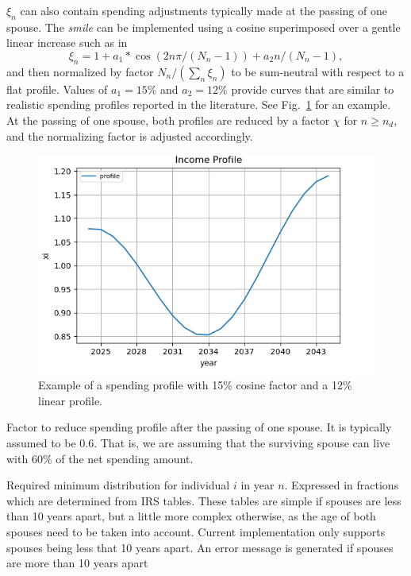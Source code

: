 \documentclass{report}[fleqn,11pt]
\begin{document}
\begin{description}[leftmargin=4em,style=multiline]
	$\xi_n$ can also contain spending adjustments typically made at the passing of one spouse.
	The {\em smile} can be implemented using a cosine superimposed over a gentle linear increase
	such as in
	\begin{equation}
		\xi_n = 1 + a_1*\cos(2n\pi/(N_n-1)) + a_2n/(N_n-1),
	\end{equation}
	and then normalized by factor $N_n/(\sum_n \xi_n )$ to be sum-neutral with respect to a flat profile.
	Values of $a_1 = 15\%$ and $a_2=12\%$ provide curves that are similar to realistic
		spending profiles reported in the literature. See Fig.~\ref{Fig:profile} for an example.
	At the passing of one spouse, both profiles are reduced by a factor $\chi$ for $n \ge n_d$,
	and the normalizing factor is adjusted accordingly.
	\begin{figure}[t]
	    \includegraphics{profile.png}
	    \caption{\small Example of a spending profile with 15\% cosine factor and a 12\% linear
	    profile. \label{Fig:profile}}
	\end{figure}
\item [$\chi$]
	Factor to reduce spending profile after the passing of one spouse. It is typically
	assumed to be 0.6. That is, we are assuming that the surviving spouse can live with
	60\% of the net spending amount.
\item [$\rho_{in}$]
	Required minimum distribution for individual $i$ in year $n$. Expressed in fractions
	which are determined from IRS tables. These tables are simple if spouses are less than 10 years apart,
	but a little more complex otherwise, as the age of both spouses need to be taken into account.
	Current implementation only supports spouses being less that 10 years apart.
	An error message is generated if spouses are more than 10 years apart

\end{description}
\end{document}
